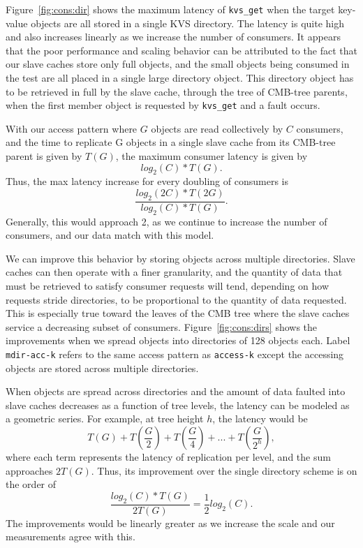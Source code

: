 Figure~\ref{fig:cons:dir} shows the maximum latency of {\tt kvs\_get}
when the target key-value objects are all stored in a single
KVS directory. The latency is quite high and also increases
linearly as we increase the number of consumers. 
It appears that the poor performance and scaling behavior 
can be attributed to the fact that our slave caches store only full
objects, and the small objects being consumed in the test are all
placed in a single large directory object.
This directory object has to be retrieved in full by the slave cache,
through the tree of CMB-tree parents, when the first
member object is requested by {\tt kvs\_get} and a fault occurs.

With our access pattern where $G$ objects are read collectively by
$C$ consumers, and the time to replicate G objects in a single slave cache
from its CMB-tree parent is given by $T(G)$, the maximum consumer latency is given by
\begin{equation}
log_2(C) * T(G).
\end{equation}
Thus, the max latency increase for every doubling of consumers is
\begin{equation}
\frac{log_2(2C) * T(2G)}{log_2(C) * T(G)}.
\end{equation}
Generally, this would approach 2, 
as we continue to increase the number of consumers,
and our data match with this model.

We can improve this behavior by storing objects across multiple
directories. Slave caches can then operate with a finer granularity,
and the quantity of data that must be retrieved to satisfy consumer
requests will tend, depending on how requests stride directories,
to be proportional to the quantity of data requested.
This is especially true toward the leaves of the CMB tree where the
slave caches service a decreasing subset of consumers.
Figure~\ref{fig:cons:dirs} shows the improvements 
when we spread objects into directories of 128 objects each.
Label {\tt mdir-acc-k} refers to the same access pattern as {\tt access-k} 
except the accessing objects are stored across multiple directories.

\ifcomments
{}
\fi
When objects are spread across directories and the amount of data
faulted into slave caches decreases as a function of tree levels, 
the latency can be modeled as a geometric series.
For example, at tree height $h$, the latency would be 
\begin{equation}
T(G) + T(\frac{G}{2}) + T(\frac{G}{4}) + ... + T(\frac{G}{2^h}),
\end{equation}
where each term represents the latency of replication per level,
and the sum approaches $2T(G)$. Thus, its improvement over the single
directory scheme is on the order of 
\begin{equation}
\frac{log_2(C) * T(G)}{2 T(G)} = \frac{1}{2}log_2(C).
\end{equation}
The improvements would be linearly 
greater as we increase the scale and our measurements agree with this. 

